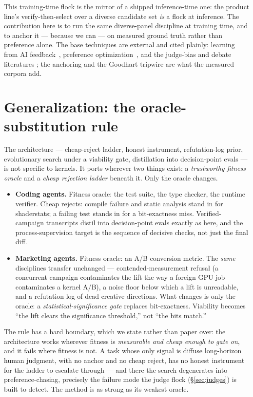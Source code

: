 \documentclass[11pt]{article}
\begin{document}
This training-time flock is the mirror of a shipped inference-time one: the  product line's
verify-then-select over a diverse candidate set \emph{is} a flock at inference. The contribution here is to
run the same diverse-panel discipline at training time, and to anchor it --- because we can --- on measured
ground truth rather than preference alone. The base techniques are external and cited plainly: learning from
AI feedback~\cite{cai}, preference optimization~\cite{dpo}, and the judge-bias and debate literatures
\cite{judgebias,debate}; the anchoring and the Goodhart tripwire are what the measured corpora add.

\section{Generalization: the oracle-substitution rule}
\label{sec:general}

The architecture --- cheap-reject ladder, honest instrument, refutation-log prior, evolutionary search under
a viability gate, distillation into decision-point evals --- is not specific to kernels. It ports wherever
two things exist: a \emph{trustworthy fitness oracle} and a \emph{cheap rejection ladder} beneath it. Only
the oracle changes.

\begin{itemize}[leftmargin=1.4em,itemsep=2pt,topsep=2pt]
\item \textbf{Coding agents.} Fitness oracle: the test suite, the type checker, the runtime verifier. Cheap
rejects: compile failure and static analysis stand in for shaderstats; a failing test stands in for a
bit-exactness miss. Verified-campaign transcripts distil into decision-point evals exactly as here, and the
process-supervision target is the sequence of decisive checks, not just the final diff.
\item \textbf{Marketing agents.} Fitness oracle: an A/B conversion metric. The \emph{same} disciplines
transfer unchanged --- contended-measurement refusal (a concurrent campaign contaminates the lift the way a
foreign GPU job contaminates a kernel A/B), a noise floor below which a lift is unreadable, and a
refutation log of dead creative directions. What changes is only the oracle: a \emph{statistical-significance
gate} replaces bit-exactness. Viability becomes ``the lift clears the significance threshold,'' not ``the
bits match.''
\end{itemize}

The rule has a hard boundary, which we state rather than paper over: the architecture works wherever fitness
is \emph{measurable and cheap enough to gate on}, and it fails where fitness is not. A task whose only
signal is diffuse long-horizon human judgment, with no anchor and no cheap reject, has no honest instrument
for the ladder to escalate through --- and there the search degenerates into preference-chasing, precisely
the failure mode the judge flock (\S\ref{sec:judges}) is built to detect. The method is as strong as its
weakest oracle.
\end{document}
